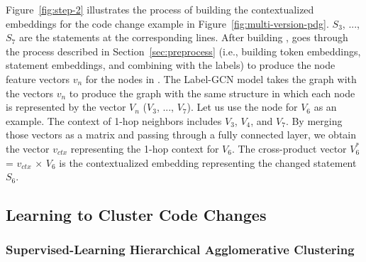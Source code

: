 Figure~\ref{fig:step-2} illustrates the process of building the
contextualized embeddings for the code change example in
Figure~\ref{fig:multi-version-pdg}. $S_3$, ..., $S_7$ are the
statements at the corresponding lines. After building {\mvpdg},
{\tool} goes through the process described in
Section~\ref{sec:preprocess} (i.e., building token embeddings,
statement embeddings, and combining with the labels) to produce the
node feature vectors $v_n$ for the nodes in {\mvpdg}. The Label-GCN model
takes the graph with the vectors $v_n$ to produce the graph with the
same structure in which each node is represented by the vector $V_n$
($V_3$, ..., $V_7$). Let us use the node for $V_6$ as an example.  The
context of 1-hop neighbors includes $V_3$, $V_4$, and $V_7$. By
merging those vectors as a matrix and passing through a fully
connected layer, we obtain the vector $v_{ctx}$ representing the 1-hop
context for $V_6$. The cross-product vector  $V^{*}_6$ = $v_{ctx}$ $\times$ $V_6$
is the contextualized embedding representing the changed statement
$S_6$.





\subsection{Learning to Cluster Code Changes}
\label{clustering:sec}

\subsubsection{Supervised-Learning Hierarchical Agglomerative Clustering}

